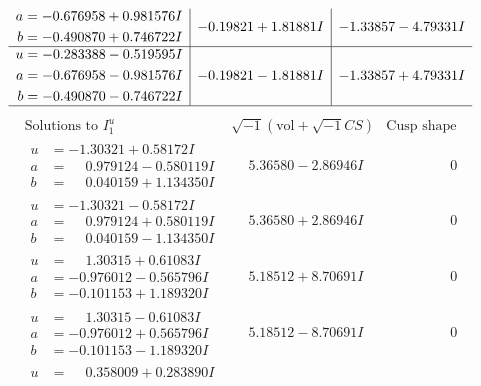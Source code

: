 \documentclass[1p]{elsarticle_modified}
\theoremstyle{definition}
\newcommand{\I}{\sqrt{-1}}
\begin{document}
$$\begin{array}{c|c|c}
\begin{aligned}
a &= -0.676958 + 0.981576 I \\
b &= -0.490870 + 0.746722 I\end{aligned}
 & -0.19821 + 1.81881 I & -1.33857 - 4.79331 I \\ \hline\begin{aligned}
u &= -0.283388 - 0.519595 I \\
a &= -0.676958 - 0.981576 I \\
b &= -0.490870 - 0.746722 I\end{aligned}
 & -0.19821 - 1.81881 I & -1.33857 + 4.79331 I\\
 \hline 
 \end{array}$$\newpage$$\begin{array}{c|c|c}  
\text{Solutions to }I^u_{1}& \I (\text{vol} + \sqrt{-1}CS) & \text{Cusp shape}\\
 \hline 
\begin{aligned}
u &= -1.30321 + 0.58172 I \\
a &= \phantom{-}0.979124 - 0.580119 I \\
b &= \phantom{-}0.040159 + 1.134350 I\end{aligned}
 & \phantom{-}5.36580 - 2.86946 I & \phantom{-0.000000 } 0 \\ \hline\begin{aligned}
u &= -1.30321 - 0.58172 I \\
a &= \phantom{-}0.979124 + 0.580119 I \\
b &= \phantom{-}0.040159 - 1.134350 I\end{aligned}
 & \phantom{-}5.36580 + 2.86946 I & \phantom{-0.000000 } 0 \\ \hline\begin{aligned}
u &= \phantom{-}1.30315 + 0.61083 I \\
a &= -0.976012 - 0.565796 I \\
b &= -0.101153 + 1.189320 I\end{aligned}
 & \phantom{-}5.18512 + 8.70691 I & \phantom{-0.000000 } 0 \\ \hline\begin{aligned}
u &= \phantom{-}1.30315 - 0.61083 I \\
a &= -0.976012 + 0.565796 I \\
b &= -0.101153 - 1.189320 I\end{aligned}
 & \phantom{-}5.18512 - 8.70691 I & \phantom{-0.000000 } 0 \\ \hline\begin{aligned}
u &= \phantom{-}0.358009 + 0.283890 I \\

\end{aligned}
\end{array}$$
\end{document}
